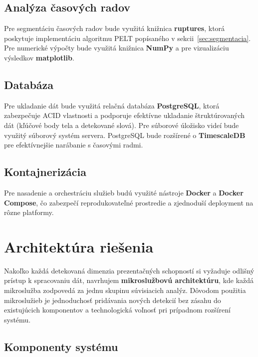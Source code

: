 \subsection{Analýza časových radov}

Pre segmentáciu časových radov bude využitá knižnica \textbf{ruptures}\cite{ruptures}, ktorá poskytuje implementáciu algoritmu PELT popísaného v sekcii~\ref{sec:segmentacia}. Pre numerické výpočty bude využitá knižnica \textbf{NumPy} a pre vizualizáciu výsledkov \textbf{matplotlib}.

\subsection{Databáza}

Pre ukladanie dát bude využitá relačná databáza \textbf{PostgreSQL}\cite{postgresql}, ktorá zabezpečuje ACID vlastnosti a podporuje efektívne ukladanie štruktúrovaných dát (kľúčové body tela a detekované slová).
Pre súborové úložisko videí bude využitý súborový systém servera.
PostgreSQL bude rozšírené o \textbf{TimescaleDB}\cite{timescaledb} pre efektívnejšie narábanie s časovými radmi.

\subsection{Kontajnerizácia}

Pre nasadenie a orchestráciu služieb budú využité nástroje \textbf{Docker} a \textbf{Docker Compose}\cite{docker}, čo zabezpečí reprodukovateľné prostredie a zjednoduší deployment na rôzne platformy.

\section{Architektúra riešenia}
Nakoľko každá detekovaná dimenzia prezentačných schopností si vyžaduje odlišný prístup k spracovaniu dát, navrhujem \textbf{mikroslužbovú architektúru}, kde každá mikroslužba zodpovedá za jednu skupinu súvisiacich analýz. Dôvodom použitia mikroslužieb je jednoduchosť pridávania nových detekcií bez zásahu do existujúcich komponentov a technologická voľnosť pri prípadnom rozšírení systému.

\subsection{Komponenty systému}

